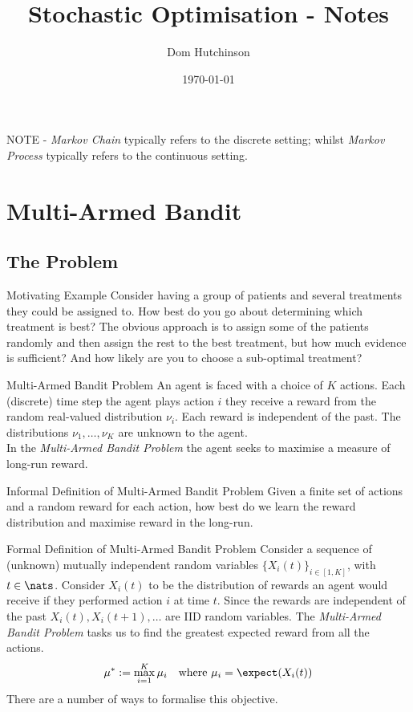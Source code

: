 \documentclass[11pt,a4paper]{article}
\begin{document}
\title{Stochastic Optimisation - Notes}
\author{Dom Hutchinson}
\date{\today}
\maketitle

NOTE - \textit{Markov Chain} typically refers to the discrete setting; whilst \textit{Markov Process} typically refers to the continuous setting.

\tableofcontents\newpage

\section{Multi-Armed Bandit}

\subsection{The Problem}

\begin{example}{Motivating Example}
  Consider having a group of patients and several treatments they could be assigned to. How best do you go about determining which treatment is best? The obvious approach is to assign some of the patients randomly and then assign the rest to the best treatment, but how much evidence is sufficient? And how likely are you to choose a sub-optimal treatment?
\end{example}

\begin{definition}{Multi-Armed Bandit Problem}
   An agent is faced with a choice of $K$ actions. Each (discrete) time step the agent plays action $i$ they receive a reward from the random real-valued distribution $\nu_i$. Each reward is independent of the past. The distributions $\nu_1,\dots,\nu_K$ are unknown to the agent.\\
   In the \textit{Multi-Armed Bandit Problem} the agent seeks to maximise a measure of long-run reward.
\end{definition}

\begin{remark}{Informal Definition of Multi-Armed Bandit Problem}
  Given a finite set of actions and a random reward for each action, how best do we learn the reward distribution and maximise reward in the long-run.
\end{remark}

\begin{definition}{Formal Definition of Multi-Armed Bandit Problem}
  Consider a sequence of (unknown) mutually independent random variables $\{X_i(t)\}_{i\in[1,K]}$, with $t\in\nats$. Consider $X_i(t)$ to be the distribution of rewards an agent would receive if they performed action $i$ at time $t$. Since the rewards are independent of the past $X_i(t),X_i(t+1),\dots$ are IID random variables. The \textit{Multi-Armed Bandit Problem} tasks us to find the greatest expected reward from all the actions.
  \[ \mu^*:=\max_{i=1}^K\mu_i\quad\text{where }\mu_i=\expect(X_i(t)) \]
  There are a number of ways to formalise this objective.
\end{definition}
\end{document}
